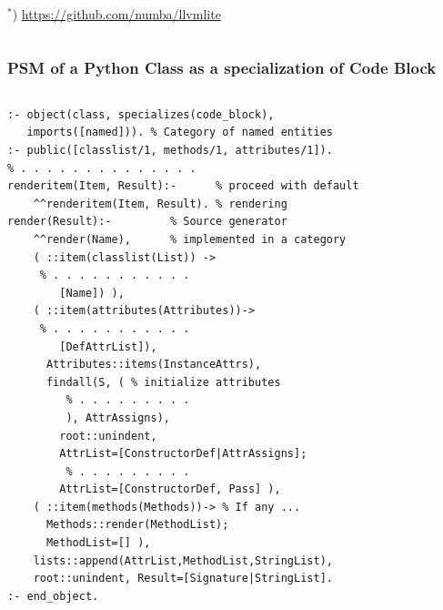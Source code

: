 \documentclass[10pt]{beamer}
\begin{document}
\begin{frame}[fragile]
\begin{columns}
\begin{column}{0.4\textwidth}
  ${}^*$) \url{https://github.com/numba/llvmlite}
    \end{column}
  \end{columns}
\end{frame}

\begin{frame}[fragile]
  \frametitle{PSM of a Python Class as a specialization of Code Block}
  \begin{columns}
    \begin{column}{0.6\textwidth}
      \flushleft
\begin{verbatim}
:- object(class, specializes(code_block),
   imports([named])). % Category of named entities
:- public([classlist/1, methods/1, attributes/1]).
% . . . . . . . . . . . . . .
renderitem(Item, Result):-      % proceed with default
    ^^renderitem(Item, Result). % rendering
render(Result):-         % Source generator
    ^^render(Name),      % implemented in a category
    ( ::item(classlist(List)) ->
     % . . . . . . . . . . .
        [Name]) ),
    ( ::item(attributes(Attributes))->
     % . . . . . . . . . . .
        [DefAttrList]),
      Attributes::items(InstanceAttrs),
      findall(S, ( % initialize attributes
         % . . . . . . . . .
         ), AttrAssigns),
        root::unindent,
        AttrList=[ConstructorDef|AttrAssigns];
         % . . . . . . . . .
        AttrList=[ConstructorDef, Pass] ),
    ( ::item(methods(Methods))-> % If any ...
      Methods::render(MethodList);
      MethodList=[] ),
    lists::append(AttrList,MethodList,StringList),
    root::unindent, Result=[Signature|StringList].
:- end_object.
\end{verbatim}
    \end{column}
    \begin{column}{0.4\linewidth}

\end{column}
\end{columns}
\end{frame}
\end{document}
